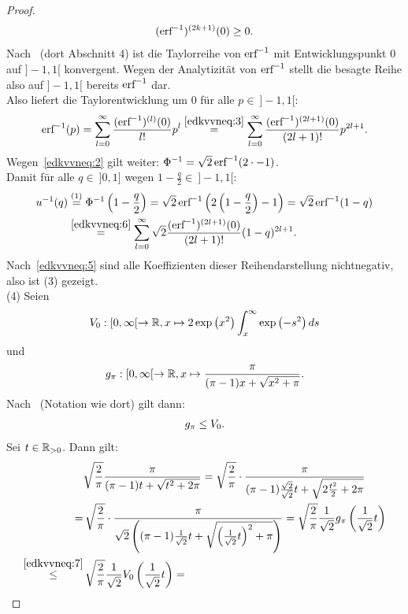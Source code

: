 \begin{proof}
\begin{align}
(\mathop{\textrm{erf}}\nolimits^{-1})^{(2k+1)}(0) \ge 0 \text.\label{edkvvneq:5}
\end{align}
Nach~\cite{Dom} (dort Abschnitt 4) ist die Taylorreihe von $\mathop{\textrm{erf}}\nolimits^{-1}$ mit
Entwicklungspunkt $0$ auf $]-1,1[$ konvergent. Wegen der Analytizität von
$\mathop{\textrm{erf}}\nolimits^{-1}$ stellt die besagte Reihe also auf $]-1,1[$ bereits $\mathop{\textrm{erf}}\nolimits^{-1}$ dar.\\
Also liefert die Taylorentwicklung um $0$ für alle $p \in \!\ ]-1,1[$:
\begin{align}
\mathop{\textrm{erf}}\nolimits^{-1}(p) = \sum_{l=0}^\infty \frac{(\mathop{\textrm{erf}}\nolimits^{-1})^{(l)}(0)}{l!}p^l
\overset{\eqref{edkvvneq:3}}=\sum_{l=0}^\infty
\frac{(\mathop{\textrm{erf}}\nolimits^{-1})^{(2l+1)}(0)}{(2l+1)!}p^{2l+1}\text.\label{edkvvneq:6}
\end{align}
Wegen~\eqref{edkvvneq:2} gilt weiter: $\Phi^{-1}=\sqrt 2\mathop{\textrm{erf}}\nolimits^{-1}(2\cdot -1)$.\\
Damit für alle $q \in \!\ ]0,1]$ wegen $1-\frac q 2 \in\!\  ]-1,1[$:
\begin{align*}
u^{-1}(q) &\overset{(1)}= \Phi^{-1}\left(1- \frac q 2\right)
= \sqrt 2 \mathop{\textrm{erf}}\nolimits^{-1}\left(2\left(1-\frac q 2 \right)-1 \right)
= \sqrt 2 \mathop{\textrm{erf}}\nolimits^{-1}(1-q)\\
&\overset{\eqref{edkvvneq:6}}= \sum_{l=0}^\infty
 \sqrt 2 \frac{(\mathop{\textrm{erf}}\nolimits^{-1})^{(2l+1)}(0)}{(2l+1)!}(1-q)^{2l+1}\text.
\end{align*}
Nach~\eqref{edkvvneq:5} sind alle Koeffizienten dieser Reihendarstellung
nichtnegativ, also ist (3) gezeigt.\\
(4) Seien \[V_0 : [0, \infty[ \rightarrow \mathbb{R}, 
x \mapsto 2\exp\left(x^2\right)\int_x^\infty \exp\left(-s^2\right)ds \]
und 
\[g_\pi:[0,\infty[\rightarrow\mathbb{R},x\mapsto \frac{\pi}{(\pi-1)x+\sqrt{x^2+\pi}}
\text.\]
Nach~\cite{RW} (Notation wie dort) gilt dann:
\begin{align}
g_\pi\le V_0\text.
\label{edkvvneq:7}
\end{align}
Sei $t \in \mathbb{R}_{>0}$. Dann gilt:
\begin{align*}
& \sqrt{\frac 2 \pi}\frac{\pi}{(\pi-1)t + \sqrt{t^2+2\pi}} =
\sqrt{\frac 2 \pi}\cdot \frac{\pi}{(\pi-1)\frac{\sqrt 2}{\sqrt 2}t
+ \sqrt{2\frac{t^2}{2} + 2\pi}}\\
 = & \,
\sqrt{\frac 2 \pi} \cdot \frac \pi {\sqrt 2\left((\pi-1)\frac 1{\sqrt 2}t  +
\sqrt{\left(\frac 1 {\sqrt{2}}t\right)^2 + \pi} \right)} 
= \sqrt{\frac 2 \pi} \frac 1 {\sqrt 2} g_\pi\left(\frac 1 {\sqrt 2} t \right)\\
\overset{\eqref{edkvvneq:7}}\le & \, \sqrt{\frac 2 \pi} \frac 1 {\sqrt 2} 
V_0\left(\frac 1 {\sqrt 2} t \right) = 

\end{align*}
\end{proof}
